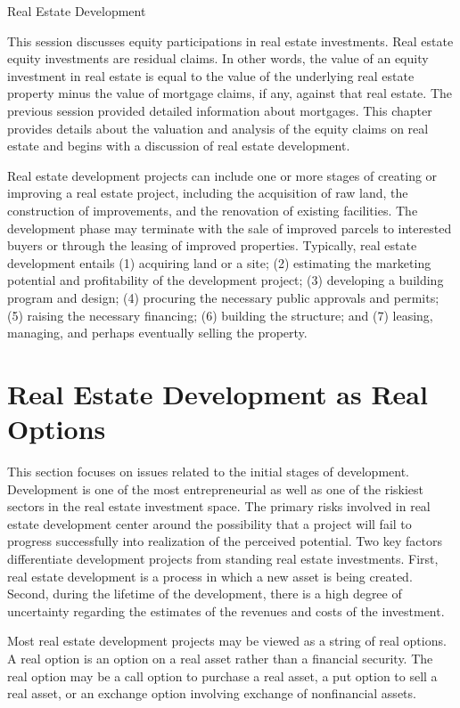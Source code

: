 \documentclass[11pt]{article}
\begin{document}
Real Estate Development

This session discusses equity participations in real estate investments. Real estate equity investments are residual claims. In other words, the value of an equity investment in real estate is equal to the value of the underlying real estate property minus the value of mortgage claims, if any, against that real estate. The previous session provided detailed information about mortgages. This chapter provides details about the valuation and analysis of the equity claims on real estate and begins with a discussion of real estate development.

Real estate development projects can include one or more stages of creating or improving a real estate project, including the acquisition of raw land, the construction of improvements, and the renovation of existing facilities. The development phase may terminate with the sale of improved parcels to interested buyers or through the leasing of improved properties. Typically, real estate development entails (1) acquiring land or a site; (2) estimating the marketing potential and profitability of the development project; (3) developing a building program and design; (4) procuring the necessary public approvals and permits; (5) raising the necessary financing; (6) building the structure; and (7) leasing, managing, and perhaps eventually selling the property.

\section*{Real Estate Development as Real Options}
This section focuses on issues related to the initial stages of development. Development is one of the most entrepreneurial as well as one of the riskiest sectors in the real estate investment space. The primary risks involved in real estate development center around the possibility that a project will fail to progress successfully into realization of the perceived potential. Two key factors differentiate development projects from standing real estate investments. First, real estate development is a process in which a new asset is being created. Second, during the lifetime of the development, there is a high degree of uncertainty regarding the estimates of the revenues and costs of the investment.

Most real estate development projects may be viewed as a string of real options. A real option is an option on a real asset rather than a financial security. The real option may be a call option to purchase a real asset, a put option to sell a real asset, or an exchange option involving exchange of nonfinancial assets.
\end{document}
